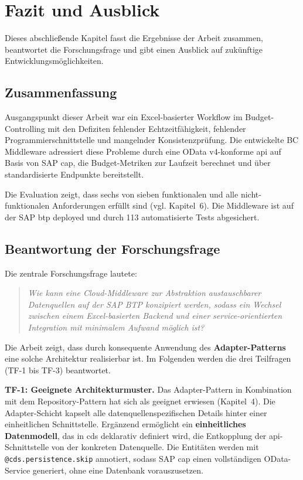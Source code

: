 \section{Fazit und Ausblick}

Dieses abschließende Kapitel fasst die Ergebnisse der Arbeit zusammen, beantwortet die Forschungsfrage und gibt einen Ausblick auf zukünftige Entwicklungsmöglichkeiten.

\subsection{Zusammenfassung}

Ausgangspunkt dieser Arbeit war ein Excel-basierter Workflow im Budget-Controlling mit den Defiziten fehlender Echtzeitfähigkeit, fehlender Programmierschnittstelle und mangelnder Konsistenzprüfung. Die entwickelte BC Middleware adressiert diese Probleme durch eine OData v4-konforme \gls{api} auf Basis von SAP \gls{cap}, die Budget-Metriken zur Laufzeit berechnet und über standardisierte Endpunkte bereitstellt.

Die Evaluation zeigt, dass sechs von sieben funktionalen und alle nicht-funktionalen Anforderungen erfüllt sind (vgl. Kapitel~6). Die Middleware ist auf der SAP \gls{btp} deployed und durch 113 automatisierte Tests abgesichert.

\subsection{Beantwortung der Forschungsfrage}

Die zentrale Forschungsfrage lautete:

\begin{quote}
\textit{Wie kann eine Cloud-Middleware zur Abstraktion austauschbarer Datenquellen auf der SAP BTP konzipiert werden, sodass ein Wechsel zwischen einem Excel-basierten Backend und einer service-orientierten Integration mit minimalem Aufwand möglich ist?}
\end{quote}

Die Arbeit zeigt, dass durch konsequente Anwendung des \textbf{Adapter-Patterns} \citep{gamma1994} eine solche Architektur realisierbar ist. Im Folgenden werden die drei Teilfragen (TF-1 bis TF-3) beantwortet.

\textbf{TF-1: Geeignete Architekturmuster.} Das Adapter-Pattern in Kombination mit dem Repository-Pattern hat sich als geeignet erwiesen (Kapitel~4). Die Adapter-Schicht kapselt alle datenquellenspezifischen Details hinter einer einheitlichen Schnittstelle. Ergänzend ermöglicht ein \textbf{einheitliches Datenmodell}, das in \gls{cds} deklarativ definiert wird, die Entkopplung der \gls{api}-Schnittstelle von der konkreten Datenquelle. Die Entitäten werden mit \texttt{@cds.persistence.skip} annotiert, sodass SAP \gls{cap} einen vollständigen OData-Service generiert, ohne eine Datenbank vorauszusetzen.


